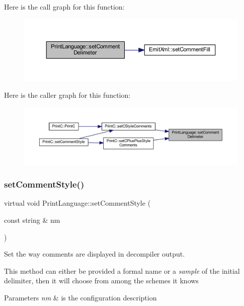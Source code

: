 Here is the call graph for this function\+:
\nopagebreak
\begin{figure}[H]
\begin{center}
\leavevmode
\includegraphics[width=350pt]{class_print_language_aeb989b6e336308e202e82035595443fb_cgraph}
\end{center}
\end{figure}
Here is the caller graph for this function\+:
\nopagebreak
\begin{figure}[H]
\begin{center}
\leavevmode
\includegraphics[width=350pt]{class_print_language_aeb989b6e336308e202e82035595443fb_icgraph}
\end{center}
\end{figure}
\mbox{\label{class_print_language_aa9f7b4fbc646531cfe3f9ad571f04ab1}} 
\subsubsection{\texorpdfstring{setCommentStyle()}{setCommentStyle()}}
{\footnotesize\ttfamily virtual void Print\+Language\+::set\+Comment\+Style (\begin{DoxyParamCaption}\item[{const string \&}]{nm }\end{DoxyParamCaption})\hspace{0.3cm}{\ttfamily [pure virtual]}}



Set the way comments are displayed in decompiler output. 

This method can either be provided a formal name or a {\itshape sample} of the initial delimiter, then it will choose from among the schemes it knows 
\begin{DoxyParams}{Parameters}
{\em nm} & is the configuration description \\
\hline
\end{DoxyParams}


